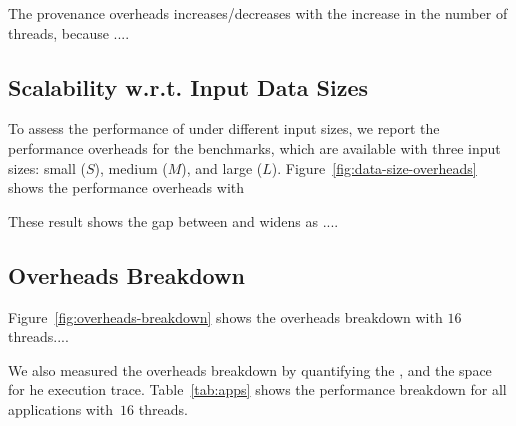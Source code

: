   The provenance overheads increases/decreases with the increase in the number of
  threads, because ....



\subsection{Scalability w.r.t. Input Data Sizes}
\label{subsec:data-sizes-overheads}

To assess the performance of \projecttitle under different input sizes, we report the performance overheads for the benchmarks, which are
available with three input sizes: small ($S$), medium ($M$), and large ($L$). Figure~\ref{fig:data-size-overheads} shows the performance overheads with 

These result shows the
gap between \pthreads and \projecttitle widens as ....





\subsection{Overheads Breakdown}
\label{subsec:overheads-breakdown}

Figure~\ref{fig:overheads-breakdown} shows the overheads breakdown with $16$ threads....





We also measured the overheads breakdown by
quantifying the , and the space for he execution trace. Table~\ref{tab:apps} shows the performance breakdown for all applications  with~$16$ threads.


